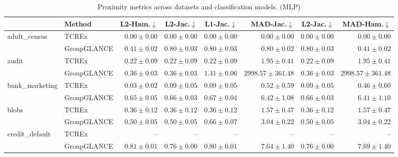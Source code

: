 \begin{table}[ht]
\centering
\caption{Proximity metrics across datasets and classification models. (MLP)}
\label{tab:proximity_metrics_mlpclassifier}
\begin{center}
\begin{sc}
\begin{scriptsize}
\begin{tabular}{l|l|rrrrrr}
\toprule
 & Method & L2-Ham.$\downarrow$ & L2-Jac.$\downarrow$ & L1-Jac.$\downarrow$ & MAD-Jac.$\downarrow$ & L2-Jac.$\downarrow$ & MAD-Ham.$\downarrow$ \\
\midrule
\multirow{2}{*}{adult\_census} & TCREx & $\boldsymbol{0.00\pm{0.00}}$ & $\boldsymbol{0.00\pm{0.00}}$ & $\boldsymbol{0.00\pm{0.00}}$ & $\boldsymbol{0.00\pm{0.00}}$ & $\boldsymbol{0.00\pm{0.00}}$ & $\boldsymbol{0.00\pm{0.00}}$ \\
 & GroupGLANCE & $0.41\pm{0.02}$ & $0.80\pm{0.03}$ & $0.80\pm{0.03}$ & $0.80\pm{0.02}$ & $0.80\pm{0.03}$ & $0.41\pm{0.02}$ \\
\midrule
\multirow{2}{*}{audit} & TCREx & $\boldsymbol{0.22\pm{0.09}}$ & $\boldsymbol{0.22\pm{0.09}}$ & $\boldsymbol{0.22\pm{0.09}}$ & $\boldsymbol{1.95\pm{0.41}}$ & $\boldsymbol{0.22\pm{0.09}}$ & $\boldsymbol{1.95\pm{0.41}}$ \\
 & GroupGLANCE & $0.36\pm{0.03}$ & $0.36\pm{0.03}$ & $1.41\pm{0.06}$ & $2998.57\pm{361.48}$ & $0.36\pm{0.03}$ & $2998.57\pm{361.48}$ \\
\midrule
\multirow{2}{*}{bank\_marketing} & TCREx & $\boldsymbol{0.03\pm{0.02}}$ & $\boldsymbol{0.09\pm{0.05}}$ & $\boldsymbol{0.09\pm{0.05}}$ & $\boldsymbol{0.52\pm{0.59}}$ & $\boldsymbol{0.09\pm{0.05}}$ & $\boldsymbol{0.46\pm{0.60}}$ \\
 & GroupGLANCE & $0.65\pm{0.05}$ & $0.66\pm{0.03}$ & $0.67\pm{0.04}$ & $6.42\pm{1.08}$ & $0.66\pm{0.03}$ & $6.41\pm{1.10}$ \\
\midrule
\multirow{2}{*}{blobs} & TCREx & $\boldsymbol{0.36\pm{0.12}}$ & $\boldsymbol{0.36\pm{0.12}}$ & $\boldsymbol{0.36\pm{0.12}}$ & $\boldsymbol{1.57\pm{0.47}}$ & $\boldsymbol{0.36\pm{0.12}}$ & $\boldsymbol{1.57\pm{0.47}}$ \\
 & GroupGLANCE & $0.50\pm{0.05}$ & $0.50\pm{0.05}$ & $0.66\pm{0.07}$ & $3.04\pm{0.22}$ & $0.50\pm{0.05}$ & $3.04\pm{0.22}$ \\
\midrule
\multirow{2}{*}{credit\_default} & TCREx & -- & -- & -- & -- & -- & -- \\
 & GroupGLANCE & $\boldsymbol{0.81\pm{0.01}}$ & $\boldsymbol{0.76\pm{0.00}}$ & $\boldsymbol{0.80\pm{0.01}}$ & $\boldsymbol{7.64\pm{1.40}}$ & $\boldsymbol{0.76\pm{0.00}}$ & $\boldsymbol{7.69\pm{1.40}}$ \\

\end{tabular}
\end{scriptsize}
\end{sc}
\end{center}
\end{table}
